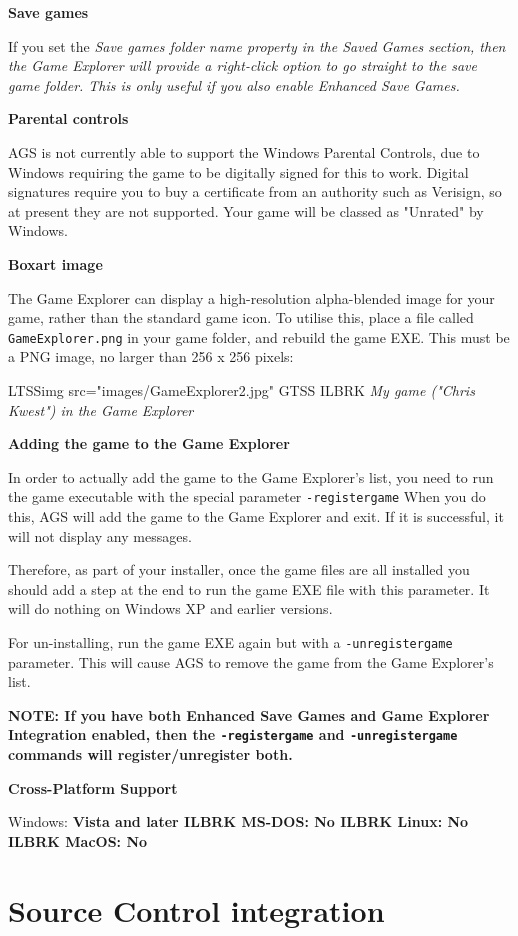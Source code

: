 \bf{Save games}

If you set the \it{Save games folder name} property in the Saved Games section, then
the Game Explorer will provide a right-click option to go straight to the save game folder.
This is only useful if you also enable Enhanced Save Games.

\bf{Parental controls}

AGS is not currently able to support the Windows Parental Controls, due to Windows requiring
the game to be digitally signed for this to work. Digital signatures require you to buy
a certificate from an authority such as Verisign, so at present they are not supported.
Your game will be classed as "Unrated" by Windows.

\bf{Boxart image}

The Game Explorer can display a high-resolution alpha-blended image for your game, rather
than the standard game icon. To utilise this, place a file called \verb$GameExplorer.png$
in your game folder, and rebuild the game EXE. This must be a PNG image, no larger
than 256 x 256 pixels:

LTSSimg src="images/GameExplorer2.jpg" GTSS ILBRK
\it{My game ("Chris Kwest") in the Game Explorer}

\bf{Adding the game to the Game Explorer}

In order to actually add the game to the Game Explorer's list, you need to run the
game executable with the special parameter \verb$-registergame$  When you do this,
AGS will add the game to the Game Explorer and exit. If it is successful, it will
not display any messages.

Therefore, as part of your installer, once the game files are all installed you should
add a step at the end to run the game EXE file with this parameter. It will do nothing
on Windows XP and earlier versions.

For un-installing, run the game EXE again but with a  \verb$-unregistergame$  parameter.
This will cause AGS to remove the game from the Game Explorer's list.

\bf{NOTE:} If you have both Enhanced Save Games and Game Explorer Integration enabled,
then the \verb$-registergame$ and \verb$-unregistergame$ commands will register/unregister
both.

\bf{Cross-Platform Support}

Windows: \bf{ Vista and later }ILBRK
MS-DOS: \bf{ No }ILBRK
Linux: \bf{ No }ILBRK
MacOS: \bf{ No }


\section{Source Control integration}\label{SourceControl}%

